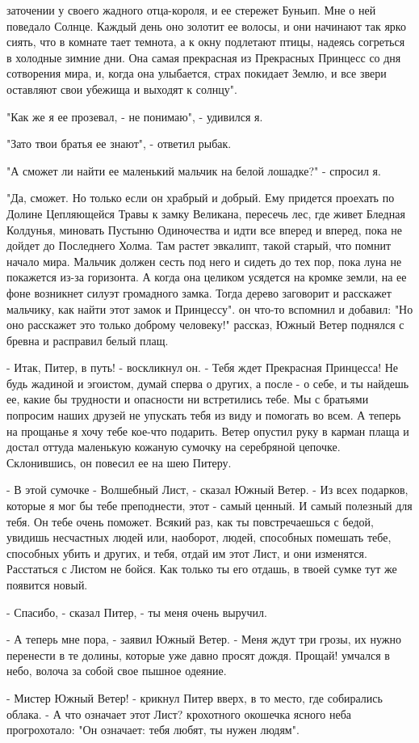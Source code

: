 заточении у своего жадного отца-короля, и ее стережет Буньип. Мне о 
ней поведало Солнце. Каждый день оно золотит ее волосы, и они начинают 
так ярко сиять, что в комнате тает темнота, а к окну подлетают птицы, 
надеясь согреться в холодные зимние дни. Она самая прекрасная из 
Прекрасных Принцесс со дня сотворения мира, и, когда она улыбается, 
страх покидает Землю, и все звери оставляют свои убежища и выходят к 
солнцу".
\par"Как же я ее прозевал, - не понимаю", - удивился я.
\par"Зато твои братья ее знают", - ответил рыбак.
\par"А сможет ли найти ее маленький мальчик на белой лошадке?" - 
спросил я.
\par"Да, сможет. Но только если он храбрый и добрый. Ему придется 
проехать по Долине Цепляющейся Травы к замку Великана, пересечь лес, 
где живет Бледная Колдунья, миновать Пустыню Одиночества и идти все 
вперед и вперед, пока не дойдет до Последнего Холма. Там растет 
эвкалипт, такой старый, что помнит начало мира. Мальчик должен сесть 
под него и сидеть до тех пор, пока луна не покажется из-за горизонта. 
А когда она целиком усядется на кромке земли, на ее фоне возникнет 
силуэт громадного замка. Тогда дерево заговорит и расскажет мальчику, 
как найти этот замок и Принцессу".
 он что-то вспомнил и добавил: "Но оно расскажет это только 
доброму человеку!"
 рассказ, Южный Ветер поднялся с бревна и расправил белый 
плащ.
\par- Итак, Питер, в путь! - воскликнул он. - Тебя ждет Прекрасная 
Принцесса! Не будь жадиной и эгоистом, думай сперва о других, а после 
- о себе, и ты найдешь ее, какие бы трудности и опасности ни 
встретились тебе. Мы с братьями попросим наших друзей не упускать тебя 
из виду и помогать во всем. А теперь на прощанье я хочу тебе кое-что 
подарить.
 Ветер опустил руку в карман плаща и достал оттуда маленькую 
кожаную сумочку на серебряной цепочке. Склонившись, он повесил ее на 
шею Питеру.
\par- В этой сумочке - Волшебный Лист, - сказал Южный Ветер. - Из всех 
подарков, которые я мог бы тебе преподнести, этот - самый ценный. И 
самый полезный для тебя. Он тебе очень поможет. Всякий раз, как ты 
повстречаешься с бедой, увидишь несчастных людей или, наоборот, людей, 
способных помешать тебе, способных убить и других, и тебя, отдай им 
этот Лист, и они изменятся. Расстаться с Листом не бойся. Как только 
ты его отдашь, в твоей сумке тут же появится новый.
\par- Спасибо, - сказал Питер, - ты меня очень выручил.
\par- А теперь мне пора, - заявил Южный Ветер. - Меня ждут три грозы, 
их нужно перенести в те долины, которые уже давно просят дождя. 
Прощай!
 умчался в небо, волоча за собой свое пышное одеяние.
\par- Мистер Южный Ветер! - крикнул Питер вверх, в то место, где 
собирались облака. - А что означает этот Лист?
 крохотного окошечка ясного неба прогрохотало: "Он означает: 
тебя любят, ты нужен людям".
